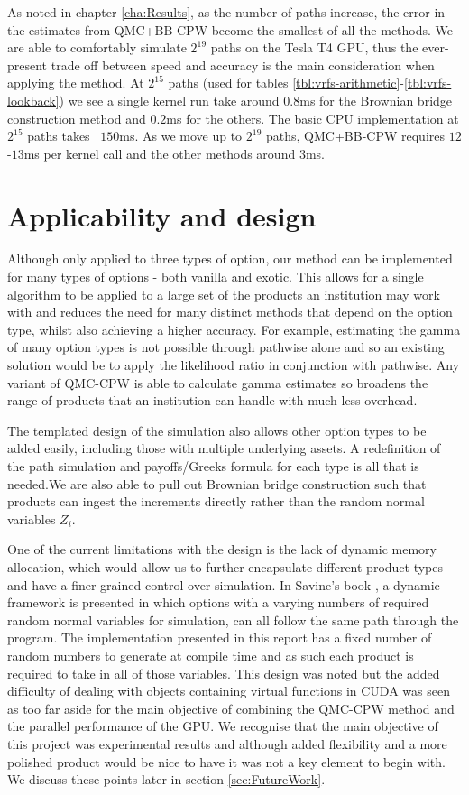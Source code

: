 As noted in chapter \ref{cha:Results}, as the number of paths increase, the error in the estimates from QMC+BB-CPW become the smallest of all the methods. We are able to comfortably simulate $2^{19}$ paths on the Tesla T4 GPU, thus the ever-present trade off between speed and accuracy is the main consideration when applying the method. At $2^{15}$ paths (used for tables \ref{tbl:vrfs-arithmetic}-\ref{tbl:vrfs-lookback}) we see a single kernel run take around $0.8$ms for the Brownian bridge construction method and $0.2$ms for the others. The basic CPU implementation at $2^{15}$ paths takes ~$150$ms. As we move up to $2^{19}$ paths, QMC+BB-CPW requires $12$-$13$ms per kernel call and the other methods around $3$ms.

\section{Applicability and design}
Although only applied to three types of option, our method can be implemented for many types of options - both vanilla and exotic. This allows for a single algorithm to be applied to a large set of the products an institution may work with and reduces the need for many distinct methods that depend on the option type, whilst also achieving a higher accuracy. For example, estimating the gamma of many option types is not possible through pathwise alone and so an existing solution would be to apply the likelihood ratio in conjunction with pathwise. Any variant of QMC-CPW is able to calculate gamma estimates so broadens the range of products that an institution can handle with much less overhead.

The templated design of the simulation also allows other option types to be added easily, including those with multiple underlying assets. A redefinition of the path simulation and payoffs/Greeks formula for each type is all that is needed.We are also able to pull out Brownian bridge construction such that products can ingest the increments directly rather than the random normal variables $Z_i$.

One of the current limitations with the design is the lack of dynamic memory allocation, which would allow us to further encapsulate different product types and have a finer-grained control over simulation. In Savine's book \cite{savine2018aad}, a dynamic framework is presented in which options with a varying numbers of required random normal variables for simulation, can all follow the same path through the program. The implementation presented in this report has a fixed number of random numbers to generate at compile time and as such each product is required to take in all of those variables. This design was noted but the added difficulty of dealing with objects containing virtual functions in CUDA was seen as too far aside for the main objective of combining the QMC-CPW method and the parallel performance of the GPU. We recognise that the main objective of this project was experimental results and although added flexibility and a more polished product would be nice to have it was not a key element to begin with. We discuss these points later in section \ref{sec:FutureWork}.